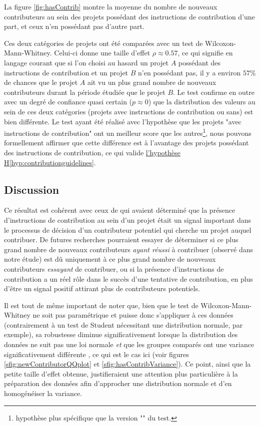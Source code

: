La figure \ref{fig:hasContrib} montre la moyenne du nombre de nouveaux contributeurs au sein des projets
possédant des instructions de contribution d'une part, et ceux n'en possédant pas d'autre part.

Ces deux catégories de projets ont été comparées avec un test de Wilcoxon-Mann-Whitney. Celui-ci donne une
taille d'effet $ρ \approx 0.57$, ce qui signifie en langage courant que si l'on choisi au hasard un projet $A$
possédant des instructions de contribution et un projet $B$ n'en possédant pas, il y a environ $57\%$ de
chances que le projet $A$ ait vu un plus grand nombre de nouveaux contributeurs durant la période étudiée que
le projet $B$. Le test confirme en outre avec un degré de confiance quasi certain ($p \approx 0$) que la
distribution des valeurs au sein de ces deux catégories (projets avec instructions de contribution ou sans)
est bien différente. Le test ayant été réalisé avec l'hypothèse que les projets "avec instructions de
contribution" ont un meilleur score que les autres\footnote{hypothèse plus spécifique que la version
"" du test.}, nous pouvons formellement affirmer que cette différence est à l'avantage des
projets possédant des instructions de contribution, ce qui valide
\hyperref[hyp:contributionguidelines]{l'hypothèse H\ref*{hyp:contributionguidelines}}.

\subsection{Discussion}

Ce résultat est cohérent avec ceux de \textcite[p.~11]{signals-2019} qui avaient déterminé que la présence
d'instructions de contribution au sein d'un projet était un signal important dans le processus de décision
d'un contributeur potentiel qui cherche un projet auquel contribuer. De futures recherches pourraient essayer
de déterminer si ce plus grand nombre de nouveaux contributeurs \emph{ayant réussi} à contribuer (observé dans
notre étude) est dû uniquement à ce plus grand nombre de nouveaux contributeurs \emph{essayant} de contribuer,
ou si la présence d'instructions de contribution a un réel rôle dans le succès d'une tentative de
contribution, en plus d'être un signal positif attirant plus de contributeurs potentiels.

Il est tout de même important de noter que, bien que le test de Wilcoxon-Mann-Whitney ne soit pas paramétrique
et puisse donc s'appliquer à ces données (contrairement à un test de Student nécessitant une distribution
normale, par exemple), sa robustesse diminue significativement lorsque la distribution des données ne suit pas
une loi normale \emph{et} que les groupes comparés ont une variance significativement différente
\parencite{WMW-robustness-1998}, ce qui est le cas ici (voir figures \ref{sfig:newContributorQQplot} et
\ref{sfig:hasContribVariance}). Ce point, ainsi que la petite taille d'effet obtenue, justifieraient une
attention plus particulière à la préparation des données afin d'approcher une distribution normale et d'en
homogénéiser la variance.

